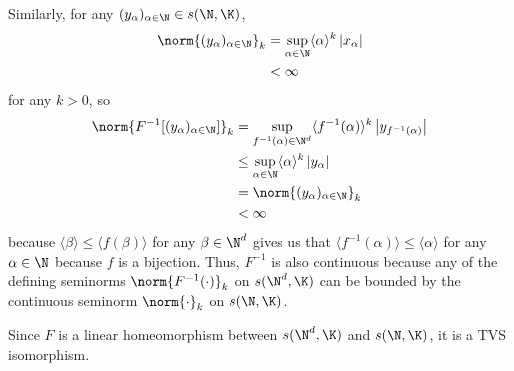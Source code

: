 \documentclass[10pt]{mypackage}
\newcommand{\brak}[1]{\langle #1 \rangle}
\begin{document}
\begin{solution}
Similarly, for any $(y_\alpha)_{\alpha\in\N} \in s(\N,\K)$,
\begin{align*}
  \norm{(y_\alpha)_{\alpha\in\N}}_k &= \sup_{\alpha\in\N}\brak{\alpha}^k\left\vert x_\alpha \right\vert \\
                                    &< \infty 
\end{align*}
for any $k > 0$, so
\begin{align*}
\norm{F^{-1}[(y_\alpha)_{\alpha\in\N}]}_k &= \sup_{f^{-1}(\alpha)\in\N^d}\brak{f^{-1}(\alpha)}^k\left\vert y_{f^{-1}(\alpha)} \right\vert\\
                                          &\leq \sup_{\alpha\in\N}\brak{\alpha}^{k}\left\vert y_\alpha \right\vert \\
                                          &= \norm{(y_\alpha)_{\alpha\in\N}}_{k}\\
                                          &< \infty
\end{align*}
because $\brak{\beta}\leq \brak{f(\beta)}$ for any $\beta\in \N^d$ gives us that $\brak{f^{-1}(\alpha)}\leq \brak{\alpha}$ for any $\alpha\in\N$ because $f$ is a bijection. Thus, $F^{-1}$ is also continuous because any of the defining seminorms $\norm{F^{-1}(\cdot)}_k$ on $s(\N^d,\K)$ can be bounded by the continuous seminorm $\norm{\cdot}_k$ on $s(\N,\K)$.

Since $F$ is a linear homeomorphism between $s(\N^d,\K)$ and $s(\N,\K)$, it is a TVS isomorphism.
\end{solution}
\end{document}
